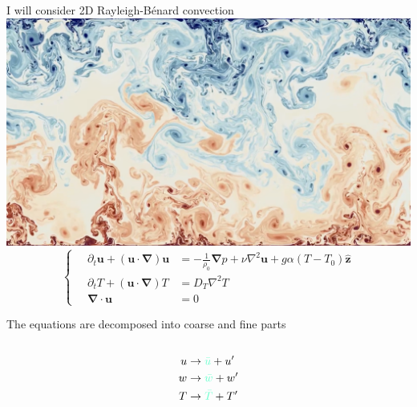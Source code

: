 \documentclass[12pt, aspectratio=169]{beamer}
\newcommand{\rb}{Rayleigh-B\'{e}nard}
\renewcommand\vec{\bm}
\newcommand{\uvec}[1]{\vec{\hat{#1}}}
\newcommand{\grad}{\vec{\nabla}}
\begin{document}
\begin{frame}{I will consider 2D \rb{} convection}
\centering
\includegraphics[height=0.5\textheight]{figures/rbc.png}
\begin{equation*}
    \left\{ \quad
    \begin{aligned}
        \partial_t \vec{u} + (\vec{u} \cdot \grad) \vec{u}
            &= -\frac{1}{\rho_0} \grad p + \nu \nabla^2 \vec{u}
            + g\alpha (T - T_0) \uvec{z} \\
        \partial_t T + (\vec{u} \cdot \grad) T &=  D_T \nabla^2 T \\
        \grad \cdot \vec{u} &= 0
    \end{aligned}
    \right.
\end{equation*}
\end{frame}

\begin{frame}{The equations are decomposed into coarse and fine parts}
\begin{columns}
\begin{column}{0.7\linewidth}
    \centering
    
\end{column}
\begin{column}{0.2\linewidth}
    \begin{align*}
        u &\to \begingroup \color{hilight} \bar{u} \endgroup + u' \\
        w &\to \begingroup \color{hilight} \bar{w} \endgroup + w' \\
        T &\to \begingroup \color{hilight} \bar{T} \endgroup + T'
    \end{align*}
\end{column}
\begin{column}{0.1\linewidth}

\end{column}
\end{columns}
\end{frame}
\end{document}
